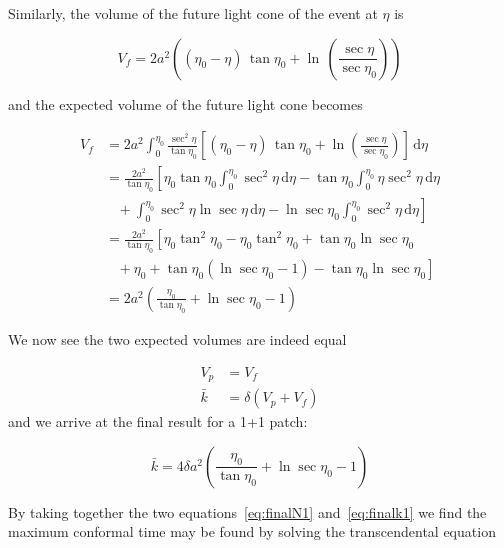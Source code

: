 \documentclass[preprint,notitlepage,amsmath,amssymb,floatfix]{revtex4-1}
\begin{document}
\noindent Similarly, the volume of the future light cone of the event at $\eta$ is

\begin{equation}
V_f = 2a^2\left(\left(\eta_0 - \eta\right)\,\tan\eta_0 + \ln\,\left(\frac{\sec\eta}{\sec\eta_0}\right)\right)
\end{equation}

\noindent and the expected volume of the future light cone becomes

\begin{equation}
\begin{split}
V_f &= 2a^2\int_0^{\eta_0} \! \frac{\sec^2\eta}{\tan\eta_0} \left[\left(\eta_0 - \eta\right)\,\tan\eta_0 + \ln\left(\frac{\sec\eta}{\sec\eta_0}\right) \right]\,\mathrm{d}\eta \\
  &= \frac{2a^2}{\tan\eta_0}\left[\eta_0\tan\eta_0\int_0^{\eta_0}\!\sec^2\eta\,\mathrm{d}\eta - \tan\eta_0 \int_0^{\eta_0}\!\eta\sec^2\eta\,\mathrm{d}\eta\right. \\ & \left.\,\,\,\,\, + \int_0^{\eta_0}\!\sec^2\eta\ln\sec\eta\,\mathrm{d}\eta - \ln\sec\eta_0\int_0^{\eta_0}\!\sec^2\eta\,\mathrm{d}\eta\right] \\
  &= \frac{2a^2}{\tan\eta_0}\left[\eta_0\tan^2\eta_0 - \eta_0\tan^2\eta_0 + \tan\eta_0\ln\sec\eta_0\right. \\ & \left.\,\,\,\,\, + \eta_0 + \tan\eta_0\left(\ln\sec\eta_0 - 1\right) - \tan\eta_0\ln\sec\eta_0\right] \\
  &= 2a^2\left(\frac{\eta_0}{\tan\eta_0} + \ln\sec\eta_0 - 1\right)
\end{split}
\end{equation}

\noindent We now see the two expected volumes are indeed equal

\begin{align}
V_p &= V_f \\
\bar{k} &= \delta\left( V_p + V_f \right)
\end{align}
\noindent and we arrive at the final result for a 1+1 patch:

\begin{equation}
\label{eq:finalk1}
\bar k = 4 \delta a^2 \left( \frac{\eta_0}{\tan\eta_0} + \ln\sec\eta_0 - 1 \right)
\end{equation}

\noindent By taking together the two equations~\eqref{eq:finalN1} and~\eqref{eq:finalk1} we find the maximum conformal time may be found by solving the transcendental equation
\end{document}
